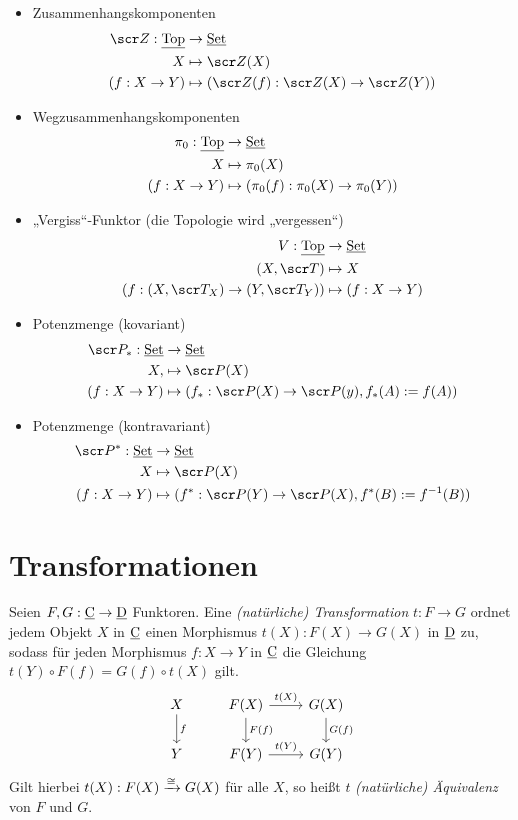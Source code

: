 \begin{ex}
	\begin{itemize}
		\item
			Zusammenhangskomponenten
			\begin{align*}
				\scr Z: \Cat{Top} &\to \Cat{Set} \\
				X &\mapsto \scr Z(X) \\
				(f:X \to Y) &\mapsto (\scr Z(f): \scr Z(X) \to \scr Z(Y))
			\end{align*}
		\item
			Wegzusammenhangskomponenten
			\begin{align*}
				\pi_0: \underline{\mathrm{Top}} &\to \underline{\mathrm{Set}} \\
				X & \mapsto \pi_0(X) \\
				(f: X \to Y) &\mapsto (\pi_0(f): \pi_0(X) \to \pi_0(Y))
			\end{align*}
		\item
			„Vergiss“-Funktor (die Topologie wird „vergessen“)
			\begin{align*}
				V: \Cat{Top} &\to \Cat{Set} \\
				(X,\scr T) & \mapsto X \\
				(f: (X,\scr T_X) \to (Y, \scr T_Y)) &\mapsto (f: X \to Y)
			\end{align*}
		\item
			Potenzmenge (kovariant)
			\begin{align*}
				\scr P_*: \Cat{Set} & \to \Cat{Set} \\
				X, & \mapsto \scr P(X) \\
				(f: X \to Y) &\mapsto (f_*: \scr P(X) \to \scr P(y), f_*(A) := f(A))
			\end{align*}
		\item
			Potenzmenge (kontravariant)
			\begin{align*}
				\scr P^*: \Cat{Set} & \to \Cat{Set} \\
				X & \mapsto \scr P(X) \\
				(f: X \to Y) &\mapsto (f^*: \scr P(Y) \to \scr P(X), f^*(B) := f^{-1}(B))
			\end{align*}
	\end{itemize}
\end{ex}


\section{Transformationen}


\begin{df}
	Seien $F, G: \underline{\mathrm{C}} \to \underline{\mathrm{D}}$ Funktoren.
	Eine \emph{(natürliche) Transformation} $t: F \to G$ ordnet jedem Objekt $X$ in $\underline{\mathrm{C}}$ einen Morphismus $t(X): F(X) \to G(X)$ in $\underline{\mathrm{D}}$ zu, sodass für jeden Morphismus $f: X \to Y$ in $\underline{\mathrm{C}}$ die Gleichung $t(Y) \circ F(f) = G(f) \circ t(X)$ gilt.
	\[
		\begin{tikzcd}
			X \arrow{d}{f} & F(X) \arrow{d}{F(f)} \arrow{r}{t(X)} & G(X) \arrow{d}{G(f)} \\
			Y & F(Y) \arrow{r}{t(Y)} & G(Y)
		\end{tikzcd}
	\]
	Gilt hierbei $t(X) : F(X) \xrightarrow{\cong} G(X)$ für alle $X$, so heißt $t$ \emph{(natürliche) Äquivalenz} von $F$ und $G$.
\end{df}

